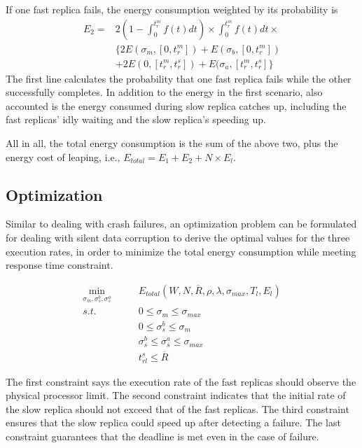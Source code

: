 If one fast replica fails, the energy consumption weighted by its probability is 
\begin{equation}
\begin{split}
E_2 = & 2(1 - \int_{0}^{t_r^m} f(t)dt) \times \int_{0}^{t_r^m} f(t)dt \times 
\\  & \{2E(\sigma_m, [0, t_r^m])+E(\sigma_b, [0, t_r^m]) \\ & + 2E(0, [t_r^m, t_r^s])+E(\sigma_a, [t_r^m, t_r^s]\} 
\end{split}
\end{equation}
The first line calculates the probability that one fast replica fails while the other successfully completes. In addition to the energy in the first scenario, also accounted is the energy consumed during slow replica catches up, including the fast replicas' idly waiting and the slow replica's speeding up. 



All in all, the total energy consumption is the sum of the above two, plus the energy cost of leaping, i.e., $E_{total}=E_1 + E_2 + N\times E_l$. 

\subsection{Optimization}
\label{sec:silent_opt}
Similar to dealing with crash failures, an optimization problem can be formulated for dealing with silent data corruption to derive the optimal values for the three execution rates, in order to minimize the total energy consumption while meeting response time constraint. 

\begin{equation}
\begin{alignedat}{2}
\min_{\sigma_m,\sigma_s^b,\sigma_s^a} \qquad  & E_{total} (W,N,\overline{R},\rho,\lambda,\sigma_{max}, T_l, E_l)  \\
s.t.  \qquad          & 0 \leq \sigma_m \leq \sigma_{max} \\
                      & 0 \leq \sigma_s^b \leq \sigma_m\\
                      & \sigma_s^b \leq \sigma_s^a \leq \sigma_{max} \\
                      & t_{rl}^s \leq \overline{R}
\end{alignedat}
\end{equation}

The first constraint says the execution rate of the fast replicas should observe the physical processor limit. The second constraint indicates that the initial rate of the slow replica should not exceed that of the fast replicas. The third constraint ensures that the slow replica could speed up after detecting a failure. The last constraint guarantees that the deadline is met even in the case of failure.







